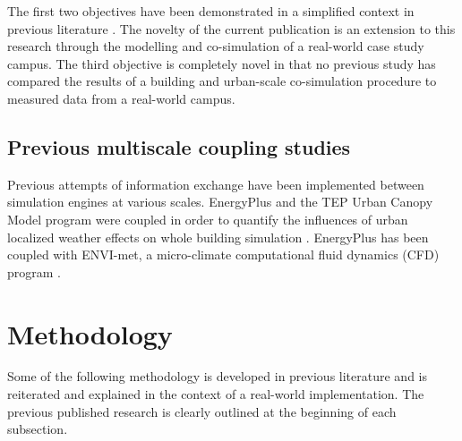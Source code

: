 \documentclass{tBPS2e}
\theoremstyle{plain}
\theoremstyle{definition}
\theoremstyle{remark}
\begin{document}
The first two objectives have been demonstrated in a simplified context in previous literature \citep{Thomas:2012wj}. The novelty of the current publication is an extension to this research through the modelling and co-simulation of a real-world case study campus. The third objective is completely novel in that no previous study has compared the results of a building and urban-scale co-simulation procedure to measured data from a real-world campus.

\subsection{Previous multiscale coupling studies}
Previous attempts of information exchange have been implemented between simulation engines at various scales. EnergyPlus and the TEP Urban Canopy Model program were coupled in order to quantify the influences of urban localized weather effects on whole building simulation \citep{Bueno:2011hi}. EnergyPlus has been coupled with ENVI-met, a micro-climate computational fluid dynamics (CFD) program
\citep{Yang:2012cr}.

\section{Methodology}
Some of the following methodology is developed in previous literature and is reiterated and explained in the context of a real-world implementation. The previous published research is clearly outlined at the beginning of each subsection.
\end{document}
